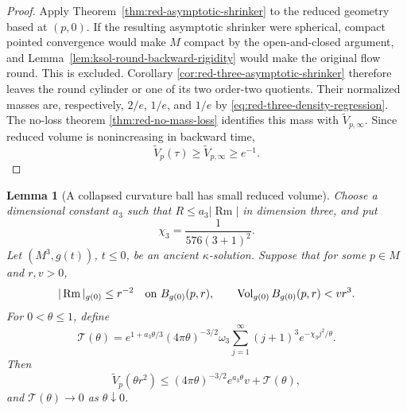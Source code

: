 \documentclass[10pt]{coll-l}
\newtheorem{lemma}[theorem]{Lemma}
\theoremstyle{definition}
\theoremstyle{remark}
\numberwithin{section}{chapter}
\numberwithin{equation}{chapter}
\newcommand{\Rm}{\operatorname{Rm}}
\newcommand{\Vol}{\operatorname{Vol}}
\begin{document}
\begin{proof}
Apply Theorem~\ref{thm:red-asymptotic-shrinker} to the reduced geometry
based at $(p,0)$.  If the resulting asymptotic shrinker were spherical,
compact pointed convergence would make $M$ compact by the open-and-closed
argument, and Lemma~\ref{lem:ksol-round-backward-rigidity} would make the
original flow round.  This is excluded.  Corollary
\ref{cor:red-three-asymptotic-shrinker} therefore leaves the round cylinder
or one of its two order-two quotients.  Their normalized masses are,
respectively, $2/e$, $1/e$, and $1/e$ by
\eqref{eq:red-three-density-regression}.  The no-loss theorem
\ref{thm:red-no-mass-loss} identifies this mass with
$\widetilde V_{p,\infty}$.  Since reduced volume is nonincreasing in
backward time,
\[
        \widetilde V_p(\tau)\geq\widetilde V_{p,\infty}\geq e^{-1}.
\]
\end{proof}

\begin{lemma}[A collapsed curvature ball has small reduced volume]
\label{lem:ksol-collapse-small-reduced-volume}
Choose a dimensional constant $a_3$ such that
$R\leq a_3|\Rm|$ in dimension three, and put
\begin{equation}
                    \chi_3=\frac1{576(3+1)^2}.        \label{eq:ksol-collapse-chi3}
\end{equation}
Let $(M^3,g(t))$, $t\leq0$, be an ancient $\kappa$-solution.  Suppose that
for some $p\in M$ and $r,v>0$,
\begin{equation}
 |\Rm|_{g(0)}\leq r^{-2}\quad\hbox{on }B_{g(0)}(p,r),
 \qquad
 \Vol_{g(0)}B_{g(0)}(p,r)<vr^3.                       \label{eq:ksol-collapsed-terminal-ball}
\end{equation}
For $0<\theta\leq1$, define
\begin{equation}
 \mathcal T(\theta)=
 e^{1+a_3\theta/3}(4\pi\theta)^{-3/2}\omega_3
 \sum_{j=1}^{\infty}(j+1)^3e^{-\chi_3j^2/\theta}.     \label{eq:ksol-collapse-tail}
\end{equation}
Then
\begin{equation}
 \widetilde V_p(\theta r^2)
 \leq(4\pi\theta)^{-3/2}e^{a_3\theta}v
       +\mathcal T(\theta),                            \label{eq:ksol-collapse-small-V}
\end{equation}
and $\mathcal T(\theta)\to0$ as $\theta\downarrow0$.
\end{lemma}
\end{document}

